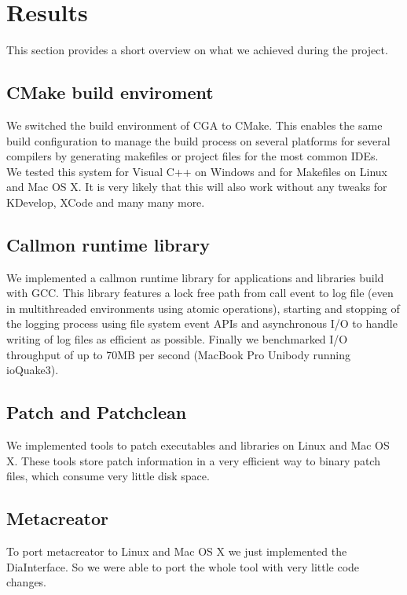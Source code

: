 \section{Results} This section provides a short overview on what we achieved during the project.

\subsection{CMake build enviroment} We switched the build environment of CGA to CMake. This enables the same build configuration to manage the build process on several platforms for several compilers by generating makefiles or project files  for the most common IDEs.\\

We tested this system for Visual C++ on Windows and for Makefiles on Linux and Mac OS X. It is very likely that this will also work without any tweaks for KDevelop, XCode and many many more.

\subsection{Callmon runtime library} We implemented a callmon runtime library for applications and libraries build with GCC. This library features a lock free path from call event to log file (even in multithreaded environments using atomic operations), starting and stopping of the logging process using file system event APIs and asynchronous I/O to handle writing of log files as efficient as possible. Finally we benchmarked I/O throughput of up to 70MB per second (MacBook Pro Unibody running ioQuake3).

\subsection{Patch and Patchclean} We implemented tools to patch executables and libraries on Linux and Mac OS X. These tools store patch information in a very efficient way to binary patch files, which consume very little disk space.

\subsection{Metacreator} To port metacreator to Linux and Mac OS X we just implemented the DiaInterface. So we were able to port the whole tool with very little code changes.\\

